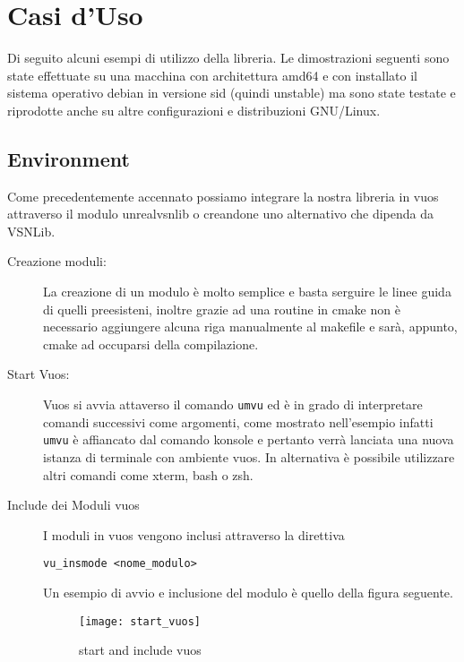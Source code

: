 

\chapter{Casi d'Uso}                %
\lhead[\fancyplain{}{\bfseries\thepage}]{\fancyplain{}{\bfseries\rightmark}}
Di seguito alcuni esempi di utilizzo della libreria.
Le dimostrazioni seguenti sono state effettuate su una macchina con architettura amd64 e con installato il sistema operativo debian in versione sid (quindi unstable) ma sono state testate e riprodotte anche su altre configurazioni e distribuzioni GNU/Linux.
\section{Environment}
Come precedentemente accennato possiamo integrare la nostra libreria in vuos attraverso il modulo unrealvsnlib o creandone uno alternativo che dipenda da VSNLib.\\
\begin{description}
\item[Creazione moduli:] La creazione di un modulo \`e molto semplice e basta serguire le linee guida di quelli preesisteni, inoltre grazie ad una routine in cmake non \`e necessario aggiungere alcuna riga manualmente al makefile e sar\`a, appunto, cmake ad occuparsi della compilazione.
\item[Start Vuos:] Vuos si avvia attaverso il comando {\tt umvu} ed \`e in grado di interpretare comandi successivi come argomenti, come mostrato nell'esempio infatti {\tt umvu} \`e affiancato dal comando konsole e pertanto verr\`a lanciata una nuova istanza di terminale con ambiente vuos.
In alternativa \`e possibile utilizzare altri comandi come xterm, bash o zsh.
\item[Include dei Moduli vuos] I moduli in vuos vengono inclusi attraverso la direttiva
\begin{verbatim}
vu_insmode <nome_modulo>
\end{verbatim}
Un esempio di avvio e inclusione del modulo \`e quello della figura seguente.
\begin{figure}[h]                       %
\begin{center}                          %
\texttt{[image: start\_vuos]}%
%
\caption[start/include\_mod vuos]{start and include vuos}\label{fig:start_vuos}
\end{center}
\end{figure}
\end{description}
